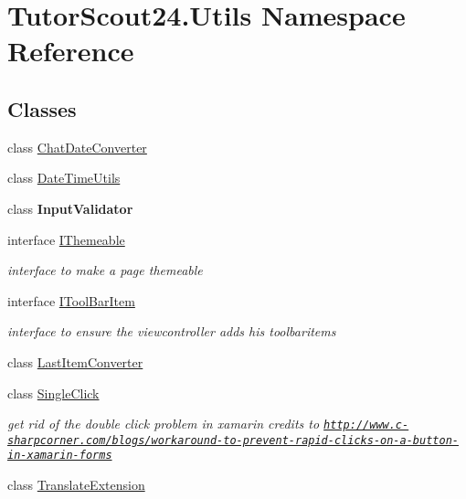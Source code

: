 \hypertarget{namespace_tutor_scout24_1_1_utils}{}\section{Tutor\+Scout24.\+Utils Namespace Reference}
\label{namespace_tutor_scout24_1_1_utils}
\subsection*{Classes}
\begin{DoxyCompactItemize}
\item 
class \mbox{\hyperlink{class_tutor_scout24_1_1_utils_1_1_chat_date_converter}{Chat\+Date\+Converter}}
\item 
class \mbox{\hyperlink{class_tutor_scout24_1_1_utils_1_1_date_time_utils}{Date\+Time\+Utils}}
\item 
class {\bfseries Input\+Validator}
\item 
interface \mbox{\hyperlink{interface_tutor_scout24_1_1_utils_1_1_i_themeable}{I\+Themeable}}
\begin{DoxyCompactList}\small\item\em interface to make a page themeable \end{DoxyCompactList}\item 
interface \mbox{\hyperlink{interface_tutor_scout24_1_1_utils_1_1_i_tool_bar_item}{I\+Tool\+Bar\+Item}}
\begin{DoxyCompactList}\small\item\em interface to ensure the viewcontroller adds his toolbaritems \end{DoxyCompactList}\item 
class \mbox{\hyperlink{class_tutor_scout24_1_1_utils_1_1_last_item_converter}{Last\+Item\+Converter}}
\item 
class \mbox{\hyperlink{class_tutor_scout24_1_1_utils_1_1_single_click}{Single\+Click}}
\begin{DoxyCompactList}\small\item\em get rid of the double click problem in xamarin credits to \href{http://www.c-sharpcorner.com/blogs/workaround-to-prevent-rapid-clicks-on-a-button-in-xamarin-forms}{\tt http\+://www.\+c-\/sharpcorner.\+com/blogs/workaround-\/to-\/prevent-\/rapid-\/clicks-\/on-\/a-\/button-\/in-\/xamarin-\/forms} \end{DoxyCompactList}\item 
class \mbox{\hyperlink{class_tutor_scout24_1_1_utils_1_1_translate_extension}{Translate\+Extension}}
\end{DoxyCompactItemize}
